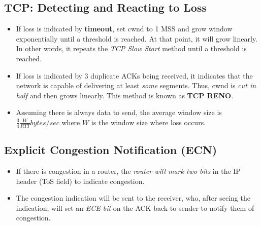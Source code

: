 \documentclass{article}
\begin{document}
\subsection{TCP: Detecting and Reacting to Loss}

\begin{itemize}
\item If loss is indicated by {\bf timeout}, set cwnd to 1 MSS and grow window exponentially until a threshold is reached. At that point, it will grow linearly. In other words, it repeats the \emph{TCP Slow Start} method until a threshold is reached.
\item If loss is indicated by 3 duplicate ACKs being received, it indicates that the network is capable of delivering at least \emph{some} segments. Thus, cwnd is \emph{cut in half} and then grows linearly. This method is known as {\bf TCP RENO}.
\item Assuming there is always data to send, the average window size is $\frac{3}{4}\frac{W}{RTT}bytes/sec$ where $W$ is the window size where loss occurs.
\end{itemize}

\subsection{Explicit Congestion Notification (ECN)}

\begin{itemize}
\item If there is congestion in a router, the \emph{router will mark two bits} in the IP header (ToS field) to indicate congestion.
\item The congestion indication will be sent to the receiver, who, after seeing the indication, will set an \emph{ECE bit} on the ACK back to sender to notify them of congestion.
\end{itemize}
\end{document}
